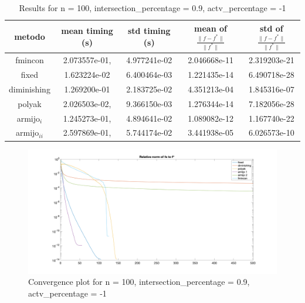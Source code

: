 
\begin{table}[H]
\setlength{\tabcolsep}{10pt} %
\renewcommand{\arraystretch}{1.2} %
\centering
\begin{tabular}{|ccccc|} 
\hline 
\multicolumn{1}{|c||}{metodo}   & \multicolumn{1}{c|}{mean timing (s)}    & \multicolumn{1}{c|}{std timing (s)} & \multicolumn{1}{c|}{mean of $\frac{\|f - f^*\|}{\|f^*\|}$}   & std of $\frac{\|f - f^*\|}{\|f^*\|}$ \\ \hline\hline 
\multicolumn{1}{|c||}{fmincon}       & \multicolumn{1}{c|}{2.073557e-01,} & \multicolumn{1}{c|}{4.977241e-02}  & \multicolumn{1}{c|}{2.046668e-11} & 2.319203e-21  \\ \hline \hline
\multicolumn{1}{|c||}{fixed}       & \multicolumn{1}{c|}{1.623224e-02} & \multicolumn{1}{c|}{6.400464e-03}  & \multicolumn{1}{c|}{1.221435e-14} & 6.490718e-28  \\ \hline 
\multicolumn{1}{|c||}{diminishing}       & \multicolumn{1}{c|}{1.269200e-01} & \multicolumn{1}{c|}{2.183725e-02}  & \multicolumn{1}{c|}{4.351213e-04} & 1.845316e-07  \\ \hline 
\multicolumn{1}{|c||}{polyak}       & \multicolumn{1}{c|}{2.026503e-02,} & \multicolumn{1}{c|}{9.366150e-03}  & \multicolumn{1}{c|}{1.276344e-14} & 7.182056e-28  \\ \hline 
\multicolumn{1}{|c||}{armijo$_{i}$}       & \multicolumn{1}{c|}{1.245273e-01,} & \multicolumn{1}{c|}{4.894641e-02}  & \multicolumn{1}{c|}{1.089082e-12} & 1.167740e-22  \\ \hline 
\multicolumn{1}{|c||}{armijo$_{ii}$}       & \multicolumn{1}{c|}{2.597869e-01,} & \multicolumn{1}{c|}{5.744174e-02}  & \multicolumn{1}{c|}{3.441938e-05} & 6.026573e-10  \\ \hline 
\end{tabular} 
\caption{Results for n = 100, intersection\_percentage = 0.9, actv\_percentage = -1}
\label{tab:100_menouno_zeronove}
\end{table}


\begin{figure}[H]
\centering
    \includegraphics[width=20cm, center]{./plots/plot_100_menouno_zeronove.png}
    \caption{Convergence plot for n = 100, intersection\_percentage = 0.9, actv\_percentage = -1}
    \label{fig:100_menouno_zeronove}
\end{figure} 


